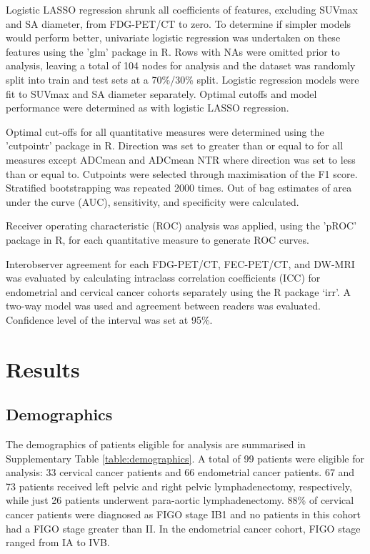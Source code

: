 \documentclass[sn-standardnature]{sn-jnl}
\theoremstyle{thmstyleone}%
\theoremstyle{thmstyletwo}%
\theoremstyle{thmstylethree}%
\begin{document}
    Logistic LASSO regression shrunk all coefficients of features, excluding SUVmax and SA diameter, from FDG-PET/CT to zero. 
    To determine if simpler models would perform better, univariate logistic regression was undertaken on these features using the 'glm' package in R.  
    Rows with NAs were omitted prior to analysis, leaving a total of 104 nodes for analysis and the dataset was randomly split into train and test sets at a 70\%/30\% split. 
    Logistic regression models were fit to SUVmax and SA diameter separately. 
    Optimal cutoffs and model performance were determined as with logistic LASSO regression. 

    Optimal cut-offs for all quantitative measures were determined using the 'cutpointr' package in R. Direction was set to greater than or equal to for all measures except ADCmean and ADCmean NTR where direction was set to less than or equal to. Cutpoints were selected through maximisation of the F1 score. Stratified bootstrapping was repeated 2000 times. Out of bag estimates of area under the curve (AUC), sensitivity, and specificity were calculated. %

    Receiver operating characteristic (ROC) analysis was applied, using the 'pROC' package in R, for each quantitative measure to generate ROC curves. 

    Interobserver agreement for each FDG-PET/CT, FEC-PET/CT, and DW-MRI was evaluated by calculating intraclass correlation coefficients (ICC) for endometrial and cervical cancer cohorts separately using the R package ‘irr’. A two-way model was used and agreement between readers was evaluated. Confidence level of the interval was set at 95\%.

\section{Results}
    \subsection{Demographics}
    The demographics of patients eligible for analysis are summarised in Supplementary Table \ref{table:demographics}. A total of 99 patients were eligible for analysis: 33 cervical cancer patients and 66 endometrial cancer patients. 67 and 73 patients received left pelvic and right pelvic lymphadenectomy, respectively, while just 26 patients underwent para-aortic lymphadenectomy. 88\% of cervical cancer patients were diagnosed as FIGO stage IB1 and no patients in this cohort had a FIGO stage greater than II. In the endometrial cancer cohort, FIGO stage ranged from IA to IVB.
\end{document}
